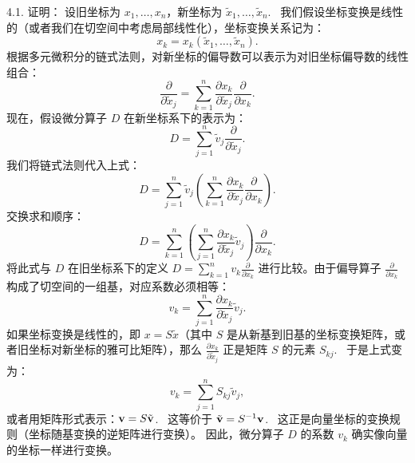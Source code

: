 \begin{exer}
4.1. 证明：
设旧坐标为 $x_1, \dots, x_n$，新坐标为 $\tilde{x}_1, \dots, \tilde{x}_n$.~
我们假设坐标变换是线性的（或者我们在切空间中考虑局部线性化），坐标变换关系记为：
$$ x_k = x_k(\tilde{x}_1, \dots, \tilde{x}_n). $$
根据多元微积分的链式法则，对新坐标的偏导数可以表示为对旧坐标偏导数的线性组合：
$$ \frac{\partial}{\partial \tilde{x}_j} = \sum_{k=1}^n \frac{\partial x_k}{\partial \tilde{x}_j} \frac{\partial}{\partial x_k}. $$
现在，假设微分算子 $D$ 在新坐标系下的表示为：
$$ D = \sum_{j=1}^n \tilde{v}_j \frac{\partial}{\partial \tilde{x}_j}. $$
我们将链式法则代入上式：
$$ D = \sum_{j=1}^n \tilde{v}_j \left( \sum_{k=1}^n \frac{\partial x_k}{\partial \tilde{x}_j} \frac{\partial}{\partial x_k} \right). $$
交换求和顺序：
$$ D = \sum_{k=1}^n \left( \sum_{j=1}^n \frac{\partial x_k}{\partial \tilde{x}_j} \tilde{v}_j \right) \frac{\partial}{\partial x_k}. $$
将此式与 $D$ 在旧坐标系下的定义 $D = \sum_{k=1}^n v_k \frac{\partial}{\partial x_k}$ 进行比较。由于偏导算子 $\frac{\partial}{\partial x_k}$ 构成了切空间的一组基，对应系数必须相等：
$$ v_k = \sum_{j=1}^n \frac{\partial x_k}{\partial \tilde{x}_j} \tilde{v}_j. $$
如果坐标变换是线性的，即 $x = S \tilde{x}$（其中 $S$ 是从新基到旧基的坐标变换矩阵，或者旧坐标对新坐标的雅可比矩阵），那么 $\frac{\partial x_k}{\partial \tilde{x}_j}$ 正是矩阵 $S$ 的元素 $S_{kj}$.~
于是上式变为：
$$ v_k = \sum_{j=1}^n S_{kj} \tilde{v}_j, $$
或者用矩阵形式表示：$\mathbf{v} = S \tilde{\mathbf{v}}$.~
这等价于 $\tilde{\mathbf{v}} = S^{-1} \mathbf{v}$.~
这正是向量坐标的变换规则（坐标随基变换的逆矩阵进行变换）。
因此，微分算子 $D$ 的系数 $v_k$ 确实像向量的坐标一样进行变换。


\vspace{5ex}


\end{exer}
